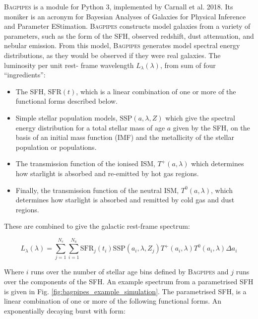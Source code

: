 \documentclass[a4paper,12pt]{article}
\begin{document}
\textsc{Bagpipes} is a module for Python 3, implemented by Carnall et al.
2018.\cite{Carnall_2018} Its moniker is an acronym for Bayesian Analyses of
Galaxies for Physical Inference and Parameter EStimation. \textsc{Bagpipes}
constructs model galaxies from a variety of parameters, such as the form of the
SFH, observed redshift, dust attenuation, and nebular emission. From this
model, \textsc{Bagpipes} generates model spectral energy distributions, as they
would be observed if they were real galaxies. The luminosity per unit rest-
frame wavelength $L_\lambda(\lambda)$, from sum of four ``ingredients'':

\begin{itemize}
  \item The SFH, $\mathrm{SFR}(t)$, which is a linear combination of one or
  more of the functional forms described below.
  \item Simple stellar population models, $\mathrm{SSP}(a,\lambda,Z)$ which
  give the spectral energy distribution for a total stellar mass of age $a$
  given by the SFH, on the basis of an initial mass function (IMF) and the
  metallicity of the stellar population or populations.
  \item The transmission function of the ionised ISM, $T^+(a,\lambda)$ which
  determines how starlight is absorbed and re-emitted by hot gas regions.
  \item Finally, the transmission function of the neutral ISM,
  $T^0(a,\lambda)$, which determines how starlight is absorbed and remitted by
  cold gas and dust regions.\cite{Carnall_2018}
\end{itemize}

\noindent These are combined to give the galactic rest-frame spectrum:

\begin{equation}\label{eq:luminosity_per_rframe_wavelength}
  L_\lambda(\lambda) =
  \sum_{j=1}^{N_c} \sum_{i=1}^{N_a}
  \mathrm{SFR}_j(t_i)
  \mathrm{SSP}(a_i,\lambda,Z_j)
  T^+(a_i,\lambda)
  T^0(a_i,\lambda)
  \Delta a_i
\end{equation}

\noindent Where $i$ runs over the number of stellar age bins defined by
\textsc{Bagpipes} and $j$ runs over the components of the
SFH.\cite{Carnall_2018} An example spectrum from a parametrised SFH is given in
Fig. \ref{fig:bagpipes_example_simulation}. The parametrised SFH, is a linear
combination of one or more of the following functional forms. An exponentially
decaying burst with form:
\end{document}

